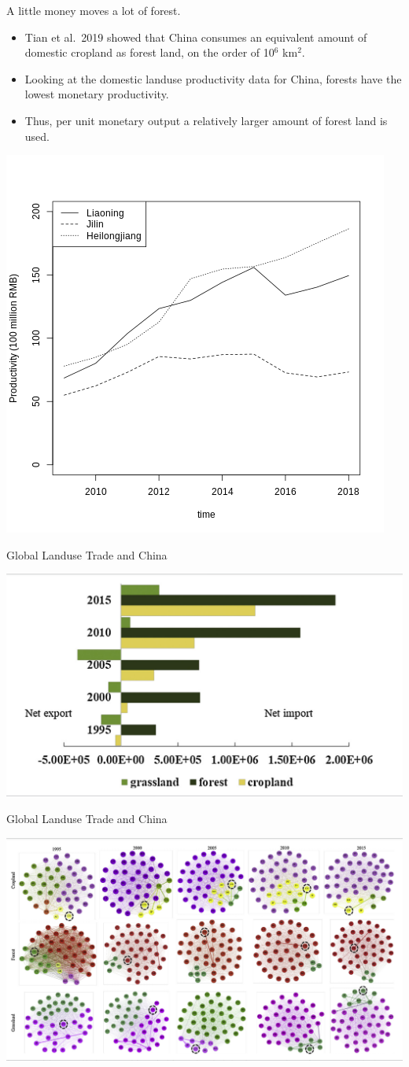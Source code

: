 \documentclass{beamer}
\begin{document}
\begin{frame}{A little money moves a lot of forest.}

\begin{itemize}
\item
  Tian et al.~2019 showed that China consumes an equivalent amount of
  domestic cropland as forest land, on the order of 10\(^6\) km\(^2\).
\item
  Looking at the domestic landuse productivity data for China, forests
  have the lowest monetary productivity.
\item
  Thus, per unit monetary output a relatively larger amount of forest
  land is used.
\end{itemize}

\begin{center}\includegraphics[width=0.5\linewidth]{images/prod_for_time_nec} \end{center}

\end{frame}

\begin{frame}{Global Landuse Trade and China}

\begin{center}\includegraphics[width=0.5\linewidth]{images/Tian_2019_Fig2} \end{center}

\end{frame}

\begin{frame}{Global Landuse Trade and China}

\begin{center}\includegraphics[width=0.5\linewidth]{images/Tian_2019_Fig3} \end{center}

\end{frame}
\end{document}
